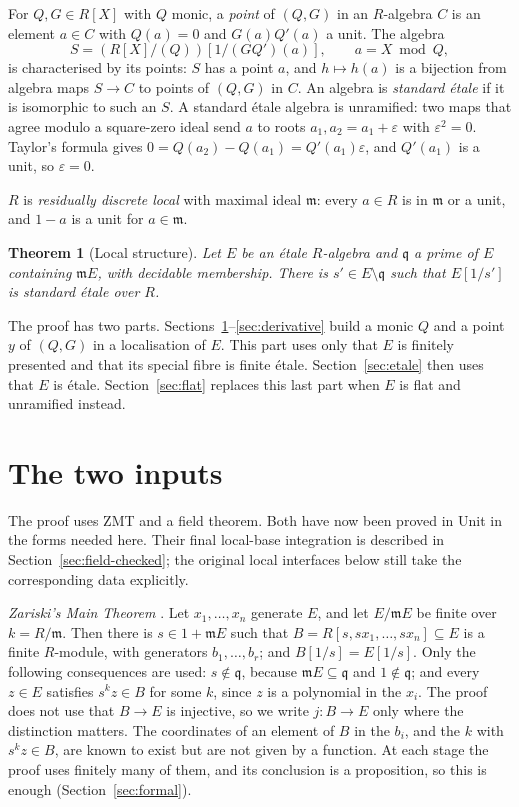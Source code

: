\documentclass[11pt]{amsart}
\numberwithin{equation}{section}
\newtheorem{theorem}{Theorem}[section]
\theoremstyle{definition}
\theoremstyle{remark}
\newcommand{\m}{\mathfrak m}
\newcommand{\q}{\mathfrak q}
\begin{document}
For $Q,G\in R[X]$ with $Q$ monic, a \emph{point} of $(Q,G)$ in an
$R$-algebra $C$ is an element $a\in C$ with $Q(a)=0$ and $G(a)Q'(a)$ a
unit. The algebra
\[
 S=(R[X]/(Q))[1/(GQ')(a)],\qquad a=X\bmod Q,
\]
is characterised by its points: $S$ has a point $a$, and $h\mapsto h(a)$
is a bijection from algebra maps $S\to C$ to points of $(Q,G)$ in $C$.
An algebra is \emph{standard \'etale} if it is isomorphic to such an
$S$. A standard \'etale algebra is unramified: two maps that agree
modulo a square-zero ideal send $a$ to roots $a_1,a_2=a_1+\varepsilon$
with $\varepsilon^2=0$. Taylor's formula gives
$0=Q(a_2)-Q(a_1)=Q'(a_1)\varepsilon$, and $Q'(a_1)$ is a unit, so
$\varepsilon=0$.

$R$ is \emph{residually discrete local} with maximal ideal $\m$: every
$a\in R$ is in $\m$ or a unit, and $1-a$ is a unit for $a\in\m$.

\begin{theorem}[Local structure]\label{thm:local}
Let $E$ be an \'etale $R$-algebra and $\q$ a prime of $E$ containing
$\m E$, with decidable membership. There is $s'\in E\setminus\q$ such
that $E[1/s']$ is standard \'etale over $R$.
\end{theorem}

The proof has two parts. Sections~\ref{sec:inputs}--\ref{sec:derivative}
build a monic $Q$ and a point $y$ of $(Q,G)$ in a localisation of $E$.
This part uses only that $E$ is finitely presented and that its special
fibre is finite \'etale. Section~\ref{sec:etale} then uses that $E$ is
\'etale. Section~\ref{sec:flat} replaces this last part when $E$ is
flat and unramified instead.

\section{The two inputs}\label{sec:inputs}

The proof uses ZMT and a field theorem. Both have now been proved in
Unit in the forms needed here. Their final local-base integration is
described in Section~\ref{sec:field-checked}; the original local
interfaces below still take the corresponding data explicitly.

\emph{Zariski's Main Theorem} \cite{ACL,ZMT}. Let $x_1,\ldots,x_n$
generate $E$, and let $E/\m E$ be finite over $k=R/\m$. Then there is
$s\in1+\m E$ such that $B=R[s,sx_1,\ldots,sx_n]\subseteq E$ is a finite
$R$-module, with generators $b_1,\ldots,b_r$; and $B[1/s]=E[1/s]$.
Only the following consequences are used: $s\notin\q$, because
$\m E\subseteq\q$ and $1\notin\q$; and every $z\in E$ satisfies
$s^kz\in B$ for some $k$, since $z$ is a polynomial in the $x_i$. The
proof does not use that $B\to E$ is injective, so we write
$j:B\to E$ only where the distinction matters. The coordinates of an
element of $B$ in the $b_i$, and the $k$ with $s^kz\in B$, are known
to exist but are not given by a function. At each stage the proof uses
finitely many of them, and its conclusion is a proposition, so this is
enough (Section~\ref{sec:formal}).
\end{document}
